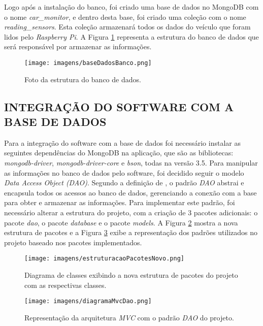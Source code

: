 Logo após a instalação do banco, foi criado uma base de dados no MongoDB com o nome \textit{car\_monitor}, e dentro desta base, foi criado uma coleção com o nome \textit{reading\_sensors}. Esta coleção armazenará todos os dados do veículo que foram lidos pelo \textit{Raspberry Pi}. A Figura \ref{Fig:base_dados} representa a estrutura do banco de dados que será responsável por armazenar as informações.

\begin{figure}[!ht]
\centering
\caption{Foto da estrutura do banco de dados.} 
{\texttt{[image: imagens/baseDadosBanco.png]}}\\
 \label{Fig:base_dados}
\end{figure}

\subsection{INTEGRAÇÃO DO SOFTWARE COM A BASE DE DADOS}
Para a integração do software com a base de dados foi necessário instalar as seguintes dependências do MongoDB na aplicação, que são as bibliotecas: \textit{mongodb-driver}, \textit{mongodb-driver-core} e \textit{bson}, todas na versão 3.5. Para manipular as informações no banco de dados pelo software, foi decidido seguir o modelo \textit{Data Access Object (DAO)}. Segundo a definição de , o padrão \textit{DAO} abstrai e encapsula todos os acessos ao banco de dados, gerenciando a conexão com a base para obter e armazenar as informações. Para implementar este padrão, foi necessário alterar a estrutura do projeto, com a criação de 3 pacotes adicionais: o pacote \textit{dao}, o pacote \textit{database} e o pacote \textit{models}. A Figura \ref{Fig:diagrama_classe_novo} mostra a nova estrutura de pacotes e a Figura \ref{Fig:diagrama_mvc_dao} exibe a representação dos padrões utilizados no projeto baseado nos pacotes implementados.

\begin{figure}[!ht]
\centering
\caption{Diagrama de classes exibindo a nova estrutura de pacotes do projeto com as respectivas classes.} 
{\texttt{[image: imagens/estruturacaoPacotesNovo.png]}}\\
 \label{Fig:diagrama_classe_novo}
\end{figure}

\begin{figure}[!ht]
\centering
\caption{Representação da arquitetura \textit{MVC} com o padrão \textit{DAO} do projeto.} 
{\texttt{[image: imagens/diagramaMvcDao.png]}}\\
 \label{Fig:diagrama_mvc_dao}
\end{figure}

